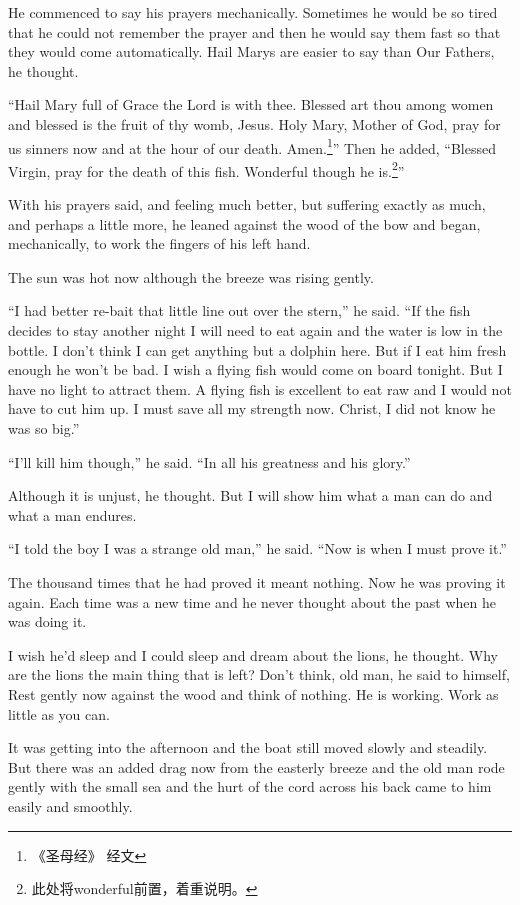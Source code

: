 \documentclass[fontset=ubuntu,zihao=-4]{ctexrep}
\begin{document}
He commenced to say his \glspl{prayer} \gls{mechanically}. Sometimes he
would be so tired that he could not remember the prayer and then he would
say them fast so that they would come automatically. Hail Marys are easier
to say than Our Fathers, he thought.

``Hail Mary full of Grace the Lord is with thee. Blessed art thou among
women and blessed is the fruit of thy womb, Jesus. Holy Mary, Mother of God,
pray for us sinners now and at the hour of our death. Amen.\footnote{《圣母经》
  经文}'' Then he added, ``Blessed Virgin, pray for the death of this fish.
Wonderful though he is.\footnote{此处将wonderful前置，着重说明。}''

With his prayers said, and feeling much better, but suffering exactly as
much, and perhaps a little more, he leaned against the wood of the bow and
began, mechanically, to work the fingers of his left hand.

The sun was hot now although the breeze was rising gently.

``I had better re-bait that little line out over the stern,'' he said. ``If
the fish decides to stay another night I will need to eat again and the
water is low in the bottle. I don't think I can get anything but a dolphin
here. But if I eat him fresh enough he won't be bad. I wish a flying fish
would come on board tonight. But I have no light to \gls{attract} them. A flying
fish is excellent to eat raw and I would not have to cut him up. I must save
all my strength now. Christ, I did not know he was so big.''

``I'll kill him though,'' he said. ``In all his \gls{greatness} and his \gls{glory}.''

Although it is \gls{unjust}, he thought. But I will show him what a man can
do and what a man endures.

``I told the boy I was a strange old man,'' he said. ``Now is when I must
prove it.''

The thousand times that he had proved it meant nothing. Now he was proving
it again. Each time was a new time and he never thought about the past when
he was doing it.

I wish he'd sleep and I could sleep and dream about the lions, he thought.
Why are the lions the main thing that is left? Don't think, old man, he said
to himself, Rest gently now against the wood and think of nothing. He is
working. Work as little as you can.

It was getting into the afternoon and the boat still moved slowly and
steadily. But there was an added drag now from the easterly breeze and the
old man rode gently with the small sea and the hurt of the cord across his
back came to him easily and smoothly.
\end{document}
